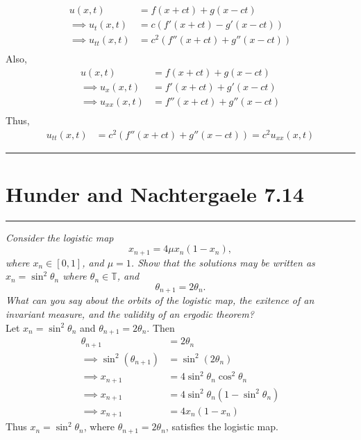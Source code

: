 \documentclass{article} %
\theoremstyle{plain}
\newcommand{\problem}[1]{
\vspace{.375cm}
\begin{minipage}{\textwidth}
    \begin{center}
        \noindent\rule{5cm}{1pt}
    \end{center}
    \section{\bf #1}
    \begin{center}
        \noindent\rule{5cm}{1pt}
    \end{center}
    \vspace{0.25cm}
\end{minipage}
}
\numberwithin{equation}{section} %
\numberwithin{figure}{section} %
\numberwithin{table}{section} %
\begin{document}
\begin{align*}
    u(x,t) &= f(x + ct) + g(x - ct) \\
    \implies u_t(x,t) &= c (f'(x + ct) - g'(x - ct)) \\
    \implies u_{tt}(x,t) &= c^2 (f''(x + ct) + g''(x - ct)) \\
\end{align*}
Also,
\begin{align*}
    u(x,t) &= f(x + ct) + g(x - ct) \\
    \implies u_x(x,t) &= f'(x + ct) + g'(x - ct) \\
    \implies u_{xx}(x,t) &= f''(x + ct) + g''(x - ct) \\
\end{align*}
Thus,
\begin{align*}
    u_{tt}(x,t) &= c^2 (f''(x + ct) + g''(x - ct)) = c^2 u_{xx}(x,t)
\end{align*}

\problem{Hunder and Nachtergaele 7.14}
\emph{Consider the logistic map $$x_{n+1} = 4\mu x_n(1 - x_n),$$ where $x_n \in [0,1]$, and $\mu = 1$.  Show that the solutions may be written as $x_n = \sin^2\theta_n$ where $\theta_n \in \mathbb{T}$, and $$\theta_{n+1} = 2\theta_n.$$  What can you say about the orbits of the logistic map, the exitence of an invariant measure, and the validity of an ergodic theorem?} \\

Let $x_n = \sin^2 \theta_n$ and $\theta_{n+1} = 2\theta_n$.  Then
\begin{align*}
    \theta_{n+1} &= 2\theta_n \\
    \implies \sin^2(\theta_{n+1}) &= \sin^2(2\theta_n) \\
    \implies x_{n+1} &= 4\sin^2\theta_n\cos^2\theta_n \\
    \implies x_{n+1} &= 4\sin^2\theta_n(1 - \sin^2\theta_n) \\
    \implies x_{n+1} &= 4x_n(1 - x_n)
\end{align*}
Thus $x_n = \sin^2 \theta_n$, where $\theta_{n+1} = 2\theta_n$,
satisfies the logistic map.
\end{document}
